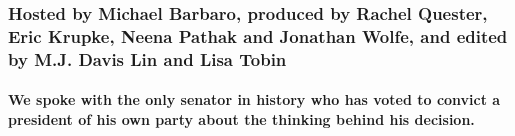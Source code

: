 \hypertarget{hosted-by-michael-barbaro-produced-by-rachel-quester-eric-krupke-neena-pathak-and-jonathan-wolfe-and-edited-by-mj-davis-lin-and-lisa-tobin}{%
\subsubsection{Hosted by Michael Barbaro, produced by Rachel Quester,
Eric Krupke, Neena Pathak and Jonathan Wolfe, and edited by M.J. Davis
Lin and Lisa
Tobin}\label{hosted-by-michael-barbaro-produced-by-rachel-quester-eric-krupke-neena-pathak-and-jonathan-wolfe-and-edited-by-mj-davis-lin-and-lisa-tobin}}

\hypertarget{we-spoke-with-the-only-senator-in-history-who-has-voted-to-convict-a-president-of-his-own-party-about-the-thinking-behind-his-decision}{%
\paragraph{We spoke with the only senator in history who has voted to
convict a president of his own party about the thinking behind his
decision.}\label{we-spoke-with-the-only-senator-in-history-who-has-voted-to-convict-a-president-of-his-own-party-about-the-thinking-behind-his-decision}}

